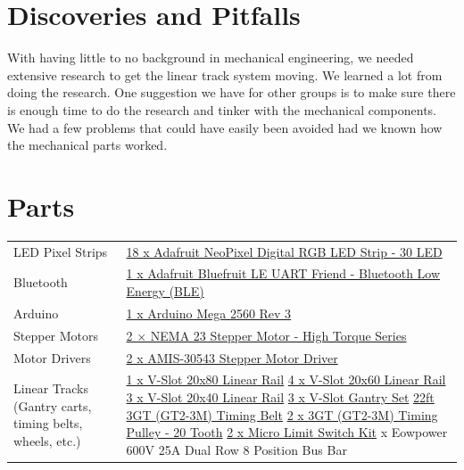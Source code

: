 \documentclass[12pt]{article}
\begin{document}
\begin{appendices}
  \section{Discoveries and Pitfalls}
  With having little to no background in mechanical engineering, we needed extensive research to get the linear track system moving. We learned a lot from doing the research. One suggestion we have for other groups is to make sure there is enough time to do the research and tinker with the mechanical components. We had a few problems that could have easily been avoided had we known how the mechanical parts worked.

  \section{Parts}
  \begin{longtable}{ p{5cm} p{10cm} }
    LED Pixel Strips             & \href{https://www.adafruit.com/product/1376?length=2}{18 x Adafruit NeoPixel Digital RGB LED Strip - 30 LED} \\[0.4cm]
    
    Bluetooth                    & \href{https://www.adafruit.com/product/2479}{1 x Adafruit Bluefruit LE UART Friend - Bluetooth Low Energy (BLE)} \\[0.4cm]
    
    Arduino                      & \href{https://store.arduino.cc/usa/arduino-mega-2560-rev3}{1 x Arduino Mega 2560 Rev 3} \\[0.4cm]
    
    Stepper Motors                & \href{https://openbuildspartstore.com/nema-23-stepper-motor-high-torque-series/}{2 × NEMA 23 Stepper Motor - High Torque Series} \\[0.4cm]

    Motor Drivers                & \href{https://www.pololu.com/product/2970}{2 x AMIS-30543 Stepper Motor Driver} \\[0.4cm]
    
    Linear Tracks (Gantry carts,
    timing belts, wheels, etc.)  & \href{https://openbuildspartstore.com/v-slot-20x80-linear-rail/}{1 x V-Slot 20x80 Linear Rail} \newline
    \href{https://openbuildspartstore.com/v-slot-20x60-linear-rail/}{4 x V-Slot 20x60 Linear Rail} \newline
    \href{https://openbuildspartstore.com/v-slot-20x40-linear-rail/}{3 x V-Slot 20x40 Linear Rail} \newline
    \href{https://openbuildspartstore.com/v-slot-gantry-set-universal/}{3 x V-Slot Gantry Set} \newline
    \href{https://openbuildspartstore.com/3gt-gt2-3m-timing-belt-by-the-foot/}{22ft 3GT (GT2-3M) Timing Belt} \newline
    \href{https://openbuildspartstore.com/3gt-timing-pulley-20-tooth/}{2 x 3GT (GT2-3M) Timing Pulley - 20 Tooth} \newline
    \href{https://openbuildspartstore.com/micro-limit-switch-kit/}{2 x Micro Limit Switch Kit} \newline6 x Eowpower 600V 25A Dual Row 8 Position Bus Bar     \\[0.4cm]
    

\end{longtable}
\end{appendices}
\end{document}
